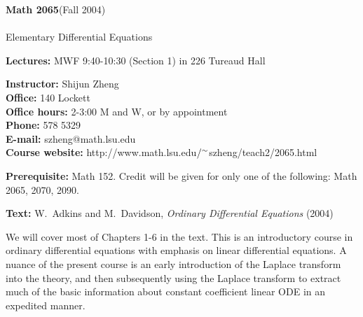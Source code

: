\documentclass[12pt]{article}
\begin{document}
\begin{center}
\begin{large}
{\bf Math 2065}\quad (Fall 2004)\\
\quad \\
Elementary Differential Equations
\end{large}
\end{center}

\vspace{.1756in}
\noindent
{\bf Lectures:} MWF 9:40-10:30 (Section 1) in 226 Tureaud Hall

\vspace{.1056in}
\noindent
{\bf Instructor:} Shijun Zheng\\  
{\bf Office:}  140 Lockett\\ 
{\bf Office hours:} 2-3:00 M and W, or by appointment\\
{\bf Phone:}  578 5329 \\
{\bf E-mail:} szheng@math.lsu.edu\\
{\bf Course website:} http://www.math.lsu.edu$/^{\tiny{\sim}}$szheng/teach2/2065.html 

\vspace{.2in}
\noindent
{\bf Prerequisite:}
Math 152.  
 Credit will be given for only one of the following: Math 2065, 2070, 2090.
  
\vspace{.15in}
\noindent
{\bf Text:} W.~Adkins and M.~Davidson, {\em Ordinary Differential Equations} (2004) 
\vspace{.162in}

We will cover most of Chapters 1-6 in the text. 
This is an introductory course in ordinary differential equations with emphasis on linear differential equations. A nuance of the present course is an early introduction of the Laplace transform into the theory, and then subsequently using the Laplace transform to extract much of the basic information about constant coefficient linear ODE in an expedited manner. 


\end{document}
